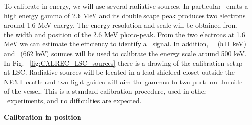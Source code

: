 To calibrate in energy, we will use several radiative sources.
In particular  \Tl ~emits a high energy gamma of 2.6 MeV and its double scape peak produces two electrons around 1.6 MeV energy.
The energy resolution and scale will be obtained from the width and position of the 2.6 MeV photo-peak. 
From the two electrons at 1.6 MeV we can estimate the efficiency to identify a \bb ~signal.  
In addition, ~\NA ~(511 keV) and \CS ~(662 keV)  sources will be used to calibrate the energy scale around 500 keV. 
In Fig. ~\ref{fig:CALREC_LSC_sources} there is a drawing of the calibration setup at LSC. Radiative sources will be located in a lead shielded closet outside the NEXT castle and two light guides will aim the gammas to two ports on the side of the vessel.  %
This is a standard calibration procedure, used in other \bb ~experiments, and no difficulties are expected.

{\bf Calibration in position}

